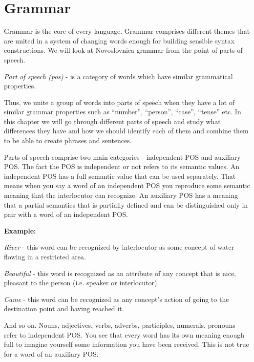 \chapter{Grammar}

Grammar is the core of every language. Grammar comprises different themes that are united in a system of changing words enough for building sensible syntax constructions. We will look at Novoslovnica grammar from the point of parts of speech.


\textit{Part of speech (\gls{pos})} - is a category of words which have similar grammatical properties.

Thus, we unite a group of words into parts of speech when they have a lot of similar grammar properties such as “number”, “person”, “case”, “tense” etc. In this chapter we will go through different parts of speech and study what differences they have and how we should identify each of them and combine them to be able to create phrases and sentences. 

Parts of speech comprise two main categories - independent POS and auxiliary POS. The fact the POS is independent or not refers to its semantic values. An independent POS has a full semantic value that can be used separately.  That means when you say a word of an independent POS you reproduce some semantic meaning that the interlocutor can recognize. An auxiliary POS has a meaning that a partial semantics that is partially defined and can be distinguished only in pair with a word of an independent POS.

\textbf{Example:}

\textit{River} - this word can be recognized by interlocutor as some concept of water flowing in a restricted area.

\textit{Beautiful} - this word is recognized as an attribute of any concept that is nice, pleasant to the person (i.e. speaker or interlocutor)

\textit{Came} - this word can be recognized as any concept’s action of going to the destination point and having reached it. 

And so on. Nouns, adjectives, verbs, adverbs, participles, numerals, pronouns refer to independent POS. You see that every word has its own meaning enough full to imagine yourself some information you have been received. This is not true for a word of an auxiliary POS. 

